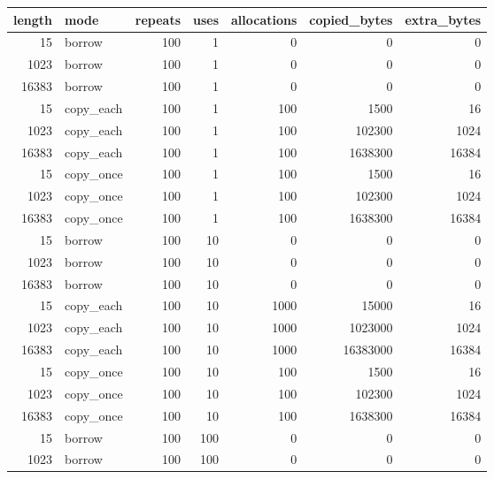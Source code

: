 \documentclass[a4paper,12pt]{extarticle}
\begin{document}
	\begin{table}[h]
		\centering
		\label{tab:results}
		\begin{tabular}{|r|l|r|r|r|r|r|}
			\hline
			\textbf{length} & \textbf{mode} & \textbf{repeats} & \textbf{uses} & \textbf{allocations} & \textbf{copied\_bytes} & \textbf{extra\_bytes} \\
			\hline
			15     & borrow     & 100      & 1   & 0     & 0         & 0     \\
			1023   & borrow     & 100      & 1   & 0     & 0         & 0     \\
			16383  & borrow     & 100      & 1   & 0     & 0         & 0     \\
			15     & copy\_each & 100      & 1   & 100   & 1500      & 16    \\
			1023   & copy\_each & 100      & 1   & 100   & 102300    & 1024  \\
			16383  & copy\_each & 100      & 1   & 100   & 1638300   & 16384 \\
			15     & copy\_once & 100      & 1   & 100   & 1500      & 16    \\
			1023   & copy\_once & 100      & 1   & 100   & 102300    & 1024  \\
			16383  & copy\_once & 100      & 1   & 100   & 1638300   & 16384 \\
			\hline
			15     & borrow     & 100      & 10  & 0     & 0         & 0     \\
			1023   & borrow     & 100      & 10  & 0     & 0         & 0     \\
			16383  & borrow     & 100      & 10  & 0     & 0         & 0     \\
			15     & copy\_each & 100      & 10  & 1000  & 15000     & 16    \\
			1023   & copy\_each & 100      & 10  & 1000  & 1023000   & 1024  \\
			16383  & copy\_each & 100      & 10  & 1000  & 16383000  & 16384 \\
			15     & copy\_once & 100      & 10  & 100   & 1500      & 16    \\
			1023   & copy\_once & 100      & 10  & 100   & 102300    & 1024  \\
			16383  & copy\_once & 100      & 10  & 100   & 1638300   & 16384 \\
			\hline
			15     & borrow     & 100      & 100 & 0     & 0         & 0     \\
			1023   & borrow     & 100      & 100 & 0     & 0         & 0     \\

\end{tabular}
\end{table}
\end{document}
